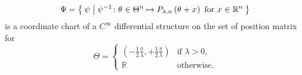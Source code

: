 \documentclass[../methodology.tex]{subfiles}
\begin{document}
\begin{lemma}\label{M:CoordinateChart}
    \[
        \Psi=\Set{\psi|
            \psi^{-1}
            \colon
            \tensor{\theta}{}\in \Theta^n
            \mapsto P_{\lambda,n}\left(\tensor{\theta}{}+\tensor{x}{}\right)
            \text{ for }
            \tensor{x}{}\in\mathbb{R}^n
        }
    \]
    is a coordinate chart of a \(C^\infty\) differential structure on the set of position matrix for
    \[
        \Theta =
        \begin{cases}
            \left(-\frac{1}{2}\frac{\pi}{\lambda},+\frac{1}{2}\frac{\pi}{\lambda}\right) & \text{if \(\lambda>0\),} \\
            \mathbb{R}                                                                   & \text{otherwise.}
        \end{cases}
    \]
\end{lemma}
\end{document}
